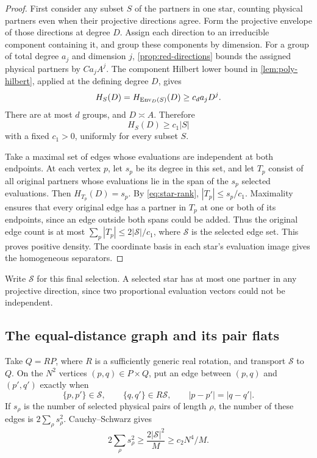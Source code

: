 \begin{proof}
First consider any subset $S$ of the partners in one star, counting physical partners even when their projective directions agree. Form the projective envelope of those directions at degree $D$. Assign each direction to an irreducible component containing it, and group these components by dimension. For a group of total degree $a_j$ and dimension $j$, \cref{prop:red-directions} bounds the assigned physical partners by $C a_j A^j$. The component Hilbert lower bound in \cref{lem:poly-hilbert}, applied at the defining degree $D$, gives
\[
 H_S(D)=H_{\operatorname{Env}_D(S)}(D)\ge c_d a_jD^j.
\]
There are at most $d$ groups, and $D\asymp A$. Therefore
\begin{equation}\label{eq:star-rank}
 H_S(D)\ge c_1|S|
\end{equation}
with a fixed $c_1>0$, uniformly for every subset $S$.

Take a maximal set of edges whose evaluations are independent at both endpoints. At each vertex $p$, let $s_p$ be its degree in this set, and let $T_p$ consist of all original partners whose evaluations lie in the span of the $s_p$ selected evaluations. Then $H_{T_p}(D)=s_p$. By \eqref{eq:star-rank}, $|T_p|\le s_p/c_1$. Maximality ensures that every original edge has a partner in $T_p$ at one or both of its endpoints, since an edge outside both spans could be added. Thus the original edge count is at most $\sum_p |T_p|\le 2|\mathcal S|/c_1$, where $\mathcal S$ is the selected edge set. This proves positive density. The coordinate basis in each star's evaluation image gives the homogeneous separators.
\end{proof}

Write $\mathcal{S}$ for this final selection. A selected star has at most one partner in any projective direction, since two proportional evaluation vectors could not be independent.

\subsection{The equal-distance graph and its pair flats}

Take $Q=RP$, where $R$ is a sufficiently generic real rotation, and transport $\mathcal{S}$ to $Q$. On the $N^2$ vertices $(p,q)\in P\times Q$, put an edge between $(p,q)$ and $(p',q')$ exactly when
\[
 \{p,p'\}\in\mathcal{S},\qquad
 \{q,q'\}\in R\mathcal{S},\qquad |p-p'|=|q-q'|.
\]
If $s_\rho$ is the number of selected physical pairs of length $\rho$, the number of these edges is $2\sum_\rho s_\rho^2$. Cauchy--Schwarz gives
\begin{equation}\label{eq:equality-edges}
 2\sum_\rho s_\rho^2
 \ge \frac{2|\mathcal{S}|^2}{M}
 \ge c_2 N^4/M.
\end{equation}

